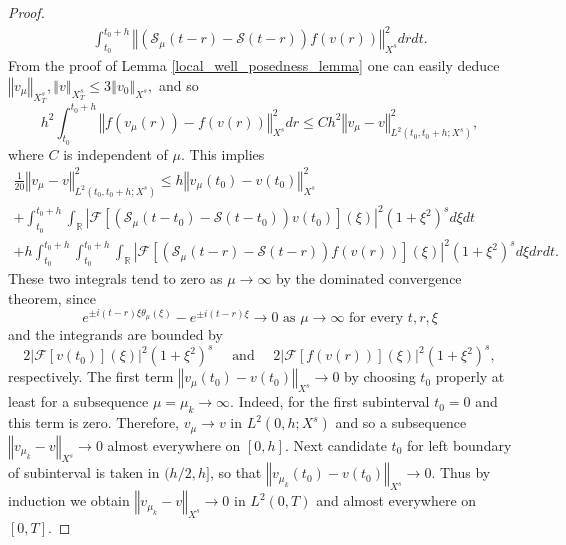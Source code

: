 \documentclass[reqno,12pt,a4paper]{article}
\theoremstyle{plain}
\newcommand{\Abs}[1]{\left\vert #1 \right\vert}
\newcommand{\norm}[1]{\left\Vert #1 \right\Vert}
\begin{document}
\begin{proof}
\begin{multline*}
    \int_{t_0}^{t_0 + h}
    \norm{
        \left(
            \mathcal S_{\mu}(t - r)
            -
            \mathcal S(t - r)
    	\right)
         f(v(r))
	}_{X^s}^2
    dr dt
    .
\end{multline*}
%
From the proof of Lemma \ref{local_well_posedness_lemma} one can easily deduce
\(
	\norm{
        v_{\mu}
    }_{X_T^s}
    ,
	\norm{
    	v
    }_{X_T^s}
    \leqslant
	3
    \norm{
        v_0
    }_{X^s}
    ,
\)
and so
\[
    h^2
    \int_{t_0}^{t_0 + h}
    \norm{
        f(v_{\mu}(r))
        -
        f(v(r))
	}_{X^s}^2
    dr
    \leqslant
    C h^2
	\norm{
        v_{\mu}
        -
    	v
    }_{ L^2(t_0, t_0 + h; X^s) }^2
    ,
\]
where $C$ is independent of $\mu$.
This implies
%
\begin{multline*}
    \frac 1{20}
	\norm{
        v_{\mu}
        -
    	v
    }_{ L^2(t_0, t_0 + h; X^s) }^2
    \leqslant
    h
	\norm{
        v_{\mu}(t_0)
        -
    	v(t_0)
    }_{X^s}^2
    \\
    +
    \int_{t_0}^{t_0 + h}
    \int_{\mathbb R}
    \Abs{
        \mathcal F
        \left[
            \left(
                \mathcal S_{\mu}(t - t_0)
                -
                \mathcal S(t - t_0)
            \right)
            v(t_0)
        \right]
        (\xi)
	}^2
    \left( 1 + \xi^2 \right)^s
    d \xi
    dt
	\\
    +
    h
    \int_{t_0}^{t_0 + h}
    \int_{t_0}^{t_0 + h}
    \int_{\mathbb R}
    \Abs{
        \mathcal F
        \left[
            \left(
                \mathcal S_{\mu}(t - r)
                -
                \mathcal S(t - r)
        	\right)
             f(v(r))
        \right]
        (\xi)
	}^2
    \left( 1 + \xi^2 \right)^s
    d \xi
    dr dt
    .
\end{multline*}
%
These two integrals tend to zero as $\mu \to \infty$ by the dominated convergence theorem,
since
\[
    e^{ \pm i (t - r) \xi \theta_{\mu}(\xi) }
    -
    e^{ \pm i (t - r) \xi }
    \to
    0
    \text{ as }
    \mu \to \infty
    \text{ for every }
    t, r, \xi
\]
and the integrands are bounded by
\[
    2
    \Abs{
        \mathcal F
        \left[
            v(t_0)
        \right]
        (\xi)
	}^2
    \left( 1 + \xi^2 \right)^s
    \quad
    \text{ and }
    \quad
    2
    \Abs{
        \mathcal F
        \left[
             f(v(r))
        \right]
        (\xi)
	}^2
    \left( 1 + \xi^2 \right)^s
    ,
\]
%
respectively.
The first term
\(
	\norm{
        v_{\mu}(t_0)
        -
    	v(t_0)
    }_{X^s}
    \to
    0
\)
by choosing $t_0$ properly at least for a subsequence $\mu = \mu_k \to \infty$.
Indeed, for the first subinterval $t_0 = 0$ and this term is zero.
Therefore,
\(
    v_{\mu} \to v
\)
in
\(
    L^2(0, h; X^s)
\)
and so a subsequence
\(
    \norm{v_{\mu_k} - v}_{X^s}
    \to
    0
\)
almost everywhere on $[0, h]$.
Next candidate $t_0$ for left boundary of subinterval is taken in $(h/2 ,h]$,
so that
\(
    \norm{v_{\mu_k}(t_0) - v(t_0)}_{X^s}
    \to
    0
    .
\)
Thus by induction we obtain
\(
    \norm{v_{\mu_k} - v}_{X^s}
    \to
    0
\)
in $L^2(0, T)$
and almost everywhere on $[0, T]$.



\end{proof}
\end{document}
